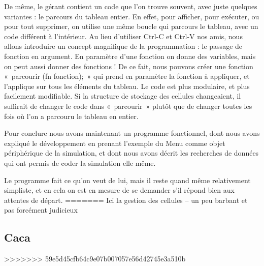 	De même, le gérant contient un code que l'on trouve souvent, avec juste quelques variantes : le parcours du tableau entier. En effet, pour afficher, pour exécuter, ou pour tout supprimer, on utilise une même boucle qui parcours le tableau, avec un code différent à l'intérieur. Au lieu d'utiliser Ctrl-C et Ctrl-V nos amis, nous allons introduire un concept magnifique de la programmation : le passage de fonction en argument. En paramètre d'une fonction on donne des variables, mais on peut aussi donner des fonctions ! De ce fait, nous pouvons créer une fonction «~parcourir (fn fonction);~» qui prend en paramètre la fonction à appliquer, et l'applique sur tous les éléments du tableau. Le code est plus modulaire, et plus facilement modifiable. Si la structure de stockage des cellules changeaient, il suffirait de changer le code dans «~parcourir~» plutôt que de changer toutes les fois où l'on a parcouru le tableau en entier. 


  Pour conclure nous avons maintenant un programme fonctionnel, dont nous avons expliqué le développement en prenant l'exemple du Menu comme objet périphérique de la simulation, et dont nous avons décrit les recherches de données qui ont permis de coder la simulation elle même.
  
  Le programme fait ce qu'on veut de lui, mais il reste quand même relativement simpliste, et en cela on est en mesure de se demander s'il répond bien aux attentes de départ.
=======
	Ici la gestion des cellules -- un peu barbant et pas forcément judicieux
\subsection{Caca}
>>>>>>> 59e5d45cfb64c9e07b007057e56d42745e3a510b
